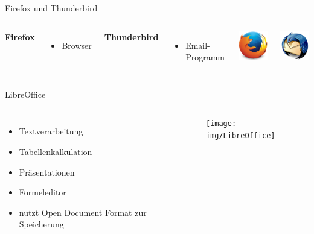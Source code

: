 \documentclass[12pt]{beamer}
\begin{document}
\begin{frame}{Firefox und Thunderbird}
  \begin{columns}
    \column{6cm}

    \textbf{Firefox}
    \begin{itemize}
      \item Browser
    \end{itemize}

    \vspace{0.5cm}

    \textbf{Thunderbird}
    \begin{itemize}
      \item Email-Programm
    \end{itemize}

    \column{5cm}

    \begin{center}
      \includegraphics[width=2cm]{img/firefox.png}
    \par\end{center}
    \begin{center}
      \includegraphics[width=2cm]{img/thunderbird.png}
    \par\end{center}
  \end{columns}
\end{frame}

\begin{frame}{LibreOffice}
  \begin{columns}
    \column{6cm}

    \begin{itemize}
      \item Textverarbeitung
      \item Tabellenkalkulation
      \item Präsentationen
      \item Formeleditor
      \item nutzt Open Document Format zur Speicherung
    \end{itemize}

    \column{5cm}

    \begin{center}
      \texttt{[image: img/LibreOffice]}
    \par\end{center}
  \end{columns}
\end{frame}
\end{document}
